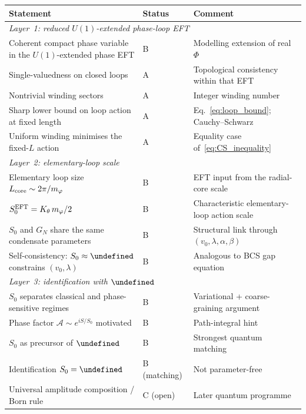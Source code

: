 \documentclass[11pt,a4paper]{article}
\let\hbar\undefined
\numberwithin{equation}{section}
\begin{document}
\begin{center}
\renewcommand{\arraystretch}{1.2}
\begin{tabular}{p{6.0cm}p{2.0cm}p{5.0cm}}
\hline
Statement & Status & Comment \\
\hline
\multicolumn{3}{l}{\textit{Layer~1: reduced $U(1)$-extended
  phase-loop EFT}} \\
Coherent compact phase variable in the
  $U(1)$-extended phase EFT
  & B & Modelling extension of real $\Phi$ \\
Single-valuedness on closed loops
  & A & Topological consistency within that EFT \\
Nontrivial winding sectors
  & A & Integer winding number \\
Sharp lower bound on loop action at fixed length
  & A & Eq.~\eqref{eq:loop_bound}; Cauchy--Schwarz \\
Uniform winding minimises the fixed-$L$ action
  & A & Equality case of~\eqref{eq:CS_inequality} \\
\hline
\multicolumn{3}{l}{\textit{Layer~2: elementary-loop scale}} \\
Elementary loop size $L_{\rm core}\sim 2\pi/m_\varphi$
  & B & EFT input from the radial-core scale \\
$S_0^{\rm EFT}=K_\theta\,m_\varphi/2$
  & B & Characteristic elementary-loop action scale \\
$S_0$ and $G_N$ share the same condensate parameters
  & B & Structural link through $(v_0,\lambda,\alpha,\beta)$ \\
Self-consistency: $S_0\approx\hbar$ constrains
  $(v_0,\lambda)$
  & B & Analogous to BCS gap equation \\
\hline
\multicolumn{3}{l}{\textit{Layer~3: identification
  with $\hbar$}} \\
$S_0$ separates classical and phase-sensitive regimes
  & B & Variational + coarse-graining argument \\
Phase factor $\mathcal{A}\sim e^{iS/S_0}$ motivated
  & B & Path-integral hint \\
$S_0$ as precursor of $\hbar$
  & B & Strongest quantum matching \\
Identification $S_0=\hbar$
  & B (matching) & Not parameter-free \\
Universal amplitude composition / Born rule
  & C (open) & Later quantum programme \\
\hline
\end{tabular}
\end{center}
\end{document}
